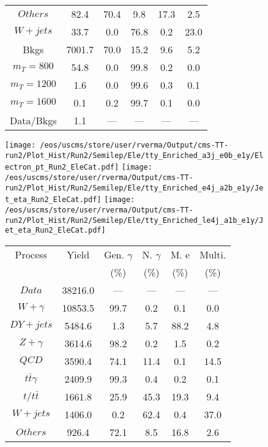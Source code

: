 \begin{figure}
\begin{minipage}[c]{0.32\textwidth}
{\begin{tabular}{cccccc}
$ Others $ &  82.4 &  70.4 &  9.8 &  17.3 &  2.5\\
$ W+jets $ &  33.7 &  0.0 &  76.8 &  0.2 &  23.0\\
Bkgs &  7001.7 &  70.0 &  15.2 &  9.6 &  5.2\\
$ m_{T} = 800 $ &  54.8 &  0.0 &  99.8 &  0.2 &  0.0\\
$ m_{T} = 1200 $ &  1.6 &  0.0 &  99.6 &  0.3 &  0.1\\
$ m_{T} = 1600 $ &  0.1 &  0.2 &  99.7 &  0.1 &  0.0\\
Data/Bkgs &  1.1 &  --- &  --- &  --- &  ---\\
\hline
\end{tabular}
}
\end{minipage}
\end{figure}

\begin{figure}
\centering
\texttt{[image: /eos/uscms/store/user/rverma/Output/cms-TT-run2/Plot\_Hist/Run2/Semilep/Ele/tty\_Enriched\_a3j\_e0b\_e1y/Electron\_pt\_Run2\_EleCat.pdf]}
\texttt{[image: /eos/uscms/store/user/rverma/Output/cms-TT-run2/Plot\_Hist/Run2/Semilep/Ele/tty\_Enriched\_e4j\_a2b\_e1y/Jet\_eta\_Run2\_EleCat.pdf]}
\texttt{[image: /eos/uscms/store/user/rverma/Output/cms-TT-run2/Plot\_Hist/Run2/Semilep/Ele/tty\_Enriched\_le4j\_a1b\_e1y/Jet\_eta\_Run2\_EleCat.pdf]}
\begin{minipage}[c]{0.32\textwidth}
\centering
\tiny{
\begin{tabular}{cccccc}
\hline
Process & Yield & Gen. $\gamma$ & N. $\gamma$ & M. e & Multi. \\
 &  & (\%) & (\%) & (\%) & (\%)  \\
\hline
                                                                      $ Data $ &  38216.0 &  --- &  --- &  --- &  ---\\
$ W+\gamma $ &  10853.5 &  99.7 &  0.2 &  0.1 &  0.0\\
$ DY+jets $ &  5484.6 &  1.3 &  5.7 &  88.2 &  4.8\\
$ Z+\gamma $ &  3614.6 &  98.2 &  0.2 &  1.5 &  0.2\\
$ QCD $ &  3590.4 &  74.1 &  11.4 &  0.1 &  14.5\\
$ t\bar{t}\gamma $ &  2409.9 &  99.3 &  0.4 &  0.2 &  0.1\\
$ t/t\bar{t} $ &  1661.8 &  25.9 &  45.3 &  19.3 &  9.4\\
$ W+jets $ &  1406.0 &  0.2 &  62.4 &  0.4 &  37.0\\
$ Others $ &  926.4 &  72.1 &  8.5 &  16.8 &  2.6\\

\end{tabular}}
\end{minipage}
\end{figure}
